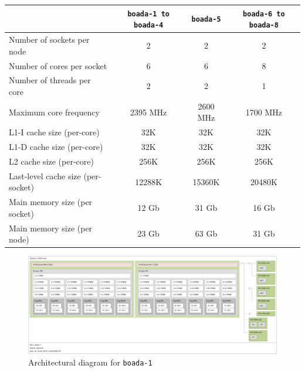 \begin{table}[htpb]%
    \label{tab:node_arch_and_mem}
    \centering
    \begin{tabular}{lccc}

    \toprule
        & \texttt{boada-1 to boada-4} & \texttt{boada-5} & \texttt{boada-6 to boada-8} \\
    \midrule
        Number of sockets per node          & 2        & 2        & 2        \\
        Number of cores per socket          & 6        & 6        & 8        \\
        Number of threads per core          & 2        & 2        & 1        \\
        Maximum core frequency              & 2395 MHz & 2600 MHz & 1700 MHz \\
    \addlinespace[1em]
        L1-I cache size (per-core)          & 32K      & 32K      & 32K      \\
        L1-D cache size (per-core)          & 32K      & 32K      & 32K      \\
        L2 cache size (per-core)            & 256K     & 256K     & 256K     \\
        Last-level cache size (per-socket)  & 12288K   & 15360K   & 20480K   \\
    \addlinespace[1em]
        Main memory size (per socket)       & 12 Gb    & 31 Gb    & 16 Gb    \\
        Main memory size (per node)         & 23 Gb    & 63 Gb    & 31 Gb    \\
    \bottomrule

    \end{tabular}
\end{table}


\begin{figure}%
    \caption{Architectural diagram for \texttt{boada-1}}%
    \label{fig:arch_boada1}
    \centering
    \includegraphics[width=\textwidth]{./data/map-boada-1.pdf}
\end{figure}

